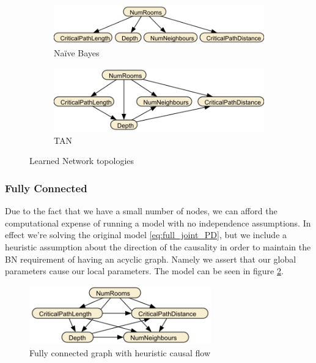 \documentclass{UoYCSproject}
\begin{document}

\begin{figure}[htb]
  \centering
  \begin{subfigure}[b]{0.43\textwidth}
    \centering
    \includegraphics[width=\textwidth]{NBNet.png}
    \caption{Na\"{i}ve Bayes}
  \end{subfigure}
  \hfill
  \begin{subfigure}[b]{0.50\textwidth}
    \centering
    \includegraphics[width=\textwidth]{TANNet.png}
    \caption{TAN}
  \end{subfigure}
  \caption{Learned Network topologies}
  \label{fig:TAN}
\end{figure}


\subsubsection{Fully Connected}
Due to the fact that we have a small number of nodes, we can afford the computational expense of running a model with no independence assumptions. In effect we're solving the original model \ref{eq:full_joint_PD}, but we include a heuristic assumption about the direction of the causality in order to maintain the BN requirement of having an acyclic graph. Namely we assert that our global parameters cause our local parameters. The model can be seen in figure \ref{fig:FullyConnected}.

\begin{figure}[htb]
  \centering
    \includegraphics[width=0.7\textwidth]{FullyConnected.png}
    \caption{Fully connected graph with heuristic causal flow}
  \label{fig:FullyConnected}
\end{figure}
\end{document}
